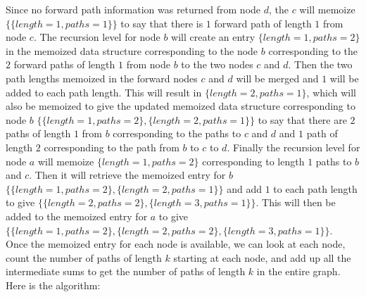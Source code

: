 \documentclass[addpoints]{exam}
\begin{document}
\begin{questions}
\begin{parts}
Since no forward path information was returned from node $d$, the $c$ will memoize $\{\{length=1, paths=1\}\}$ to say that there is $1$ forward path of length $1$ from node $c$. The recursion level for node $b$ will create an entry $\{length=1, paths=2\}$ in the memoized data structure corresponding to the node $b$ corresponding to the $2$ forward paths of length $1$ from node $b$ to the two nodes $c$ and $d$. Then the two path lengths memoized in the forward nodes $c$ and $d$ will be merged and $1$ will be added to each path length. This will result in $\{length=2, paths=1\}$, which will also be memoized to give the updated memoized data structure corresponding to node $b$ $\{\{length=1, paths=2\}, \{length=2, paths=1\}\}$ to say that there are $2$ paths of length $1$ from $b$ corresponding to the paths to $c$ and $d$ and $1$ path of length $2$ corresponding to the path from $b$ to $c$ to $d$. Finally the recursion level for node $a$ will memoize $\{length=1, paths=2\}$ corresponding to length $1$ paths to  $b$ and $c$. Then it will retrieve the memoized entry for $b$ $\{\{length=1, paths=2\}, \{length=2, paths=1\}\}$ and add $1$ to each path length to give $\{\{length=2, paths=2\}, \{length=3, paths=1\}\}$. This will then be added to the memoized entry for $a$ to give $\{\{length=1, paths=2\}, \{length=2, paths=2\}, \{length=3, paths=1\}\}$.\\

Once the memoized entry for each node is available, we can look at each node, count the number of paths of length $k$ starting at each node, and add up all the intermediate sums to get the number of paths of length $k$ in the entire graph. Here is the algorithm:


\end{parts}
\end{questions}
\end{document}
